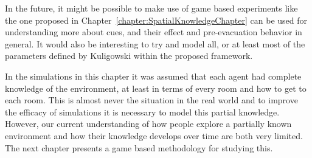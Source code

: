 In the future, it might be possible to make use of game based experiments like the one proposed in Chapter~\ref{chapter:SpatialKnowledgeChapter} can be used for understanding more about cues, and their effect and pre-evacuation behavior in general. It would also be interesting to try and model all, or at least most of the parameters defined by Kuligowski within the proposed framework.

In the simulations in this chapter it was assumed that each agent had complete knowledge of the environment, at least in terms of every room and how to get to each room. This is almost never the situation in the real world and to improve the efficacy of simulations it is necessary to model this partial knowledge. However, our current understanding of how people explore a partially known environment and how their knowledge develops over time are both very limited. The next chapter presents a game based methodology for studying this.
